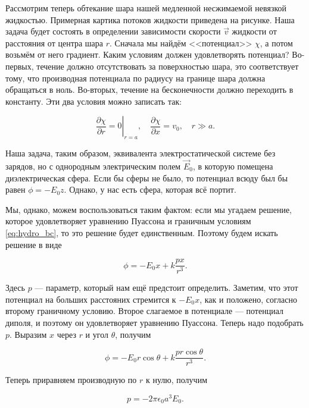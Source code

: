 \documentclass[12pt,a4paper]{article}
\numberwithin{equation}{section}
\numberwithin{equation}{section}
\newcommand{\pt}{\partial}
\newcommand{\eps}{\epsilon}
\begin{document}
Рассмотрим теперь обтекание шара нашей медленной несжимаемой невязкой
жидкостью. Примерная картика потоков жидкости приведена на
рисунке. Наша задача будет состоять в определении зависимости скорости
$\vec{v}$ жидкости от расстояния от центра шара $r$. Сначала мы найдём
<<потенциал>> $\chi$, а потом возьмём от него градиент. Каким условиям
должен удовлетворять потенциал? Во-первых, течение должно
отсутствовать за поверхностью шара, это соответствует тому, что
производная потенциала по радиусу на границе шара должна обращаться в
ноль. Во-вторых, течение на бесконечности должно переходить в
константу. Эти два условия можно записать так:

\begin{equation}
  \label{eq:hydro_bc}
  \left.\frac{\pt \chi}{\pt r} = 0\right|_{r=a}, \quad \frac{\pt
    \chi}{\pt x} = v_0, \quad r \gg a.
\end{equation}

Наша задача, таким образом, эквивалента электростатической системе без
зарядов, но с однородным электрическим полем $\vec{E}_0$, в которую
помещена диэлектрическая сфера. Если бы сферы не было, то потенциал
всюду был бы равен $\phi = - E_0 z$. Однако, у нас есть сфера, которая
всё портит. 

Мы, однако, можем воспользоваться таким фактом: если мы угадаем
решение, которое удовлетворяет уравнению Пуассона и граничным
условиям \eqref{eq:hydro_bc}, то это решение будет
единственным. Поэтому будем искать решение в виде 

\begin{equation}
  \label{eq:hydro_4}
  \phi = -E_0 x + k\frac{px}{r^3}.
\end{equation}

Здесь $p$ --- параметр, который нам ещё предстоит определить. Заметим,
что этот потенциал на больших расстояних стремится к $-E_0 x$, как и
положено, согласно второму граничному условию. Второе слагаемое в
потенциале --- потенциал диполя, и поэтому он удовлетворяет уравнению
Пуассона. Теперь надо подобрать $p$. Выразим $x$ через $r$ и угол
$\theta$, получим

\begin{equation}
  \label{eq:hydro_5}
  \phi = - E_0 r \cos \theta + k \frac{p r \cos \theta}{r^3}.
\end{equation}

Теперь приравняем производную по $r$ к нулю, получим

\begin{equation}
  \label{eq:hydro_6}
  p = -2\pi \eps_0 a^3 E_0.
\end{equation}
\end{document}
